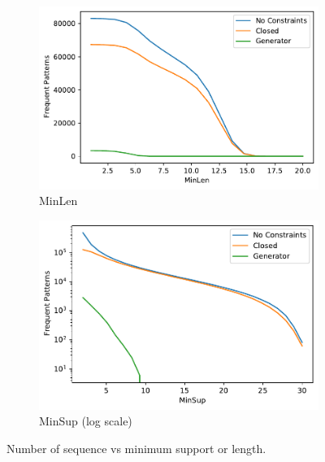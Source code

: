 \documentclass[10pt, a4paper, twocolumn]{article}
\begin{document}
\begin{figure}
    \centering
        \begin{subfigure}[t]{0.49\columnwidth}
    \includegraphics[width=\linewidth]{MinLen_walking_up.pdf}
    \caption{MinLen}
    \label{fig:minlen}
    \end{subfigure}
    \hfill%
    \begin{subfigure}[t]{0.48\columnwidth}
    \includegraphics[width=\linewidth]{MinSup_walking_up.pdf}
    \caption{MinSup (log scale)}
    \label{fig:minsup}
    \end{subfigure}
\caption{Number of sequence vs minimum support or length.}
\label{seqmin}
\end{figure}
\end{document}
